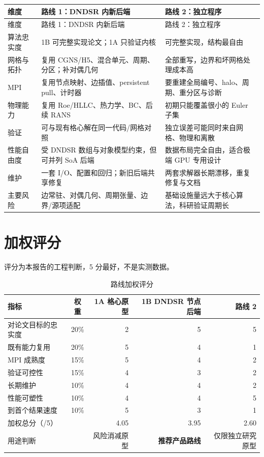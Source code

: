 \documentclass[UTF8,a4paper,11pt,openany]{ctexrep}
\numberwithin{equation}{chapter}
\begin{document}
\begin{longtable}{>{\raggedright\arraybackslash}p{}p{}p{}}
\toprule
维度 & 路线 1：DNDSR 内新后端 & 路线 2：独立程序\\
\midrule
\endfirsthead
\toprule
维度 & 路线 1：DNDSR 内新后端 & 路线 2：独立程序\\
\midrule
\endhead
算法忠实度 & 1B 可完整实现论文；1A 只验证内核 & 可完整实现，结构最自由\\
网格与拓扑 & 复用 CGNS/H5、混合单元、周期、分区；补对偶几何 & 全部重写，边界和坏网格处理成本高\\
MPI & 复用节点映射、边插值、persistent pull、计时器 & 要重建全局编号、halo、周期、重分区与诊断\\
物理能力 & 复用 Roe/HLLC、热力学、BC、后续 RANS & 初期只能覆盖很小的 Euler 子集\\
验证 & 可与现有格心解在同一代码/网格对照 & 独立误差可能同时来自网格、物理和离散\\
性能自由度 & 受 DNDSR 数组与对象模型约束，但可并列 SoA 后端 & 数据布局完全自由，适合极端 GPU 专用设计\\
维护 & 一套 I/O、配置和回归；新旧后端共享修复 & 两套求解器长期漂移，重复修复与文档\\
主要风险 & 边常驻、对偶几何、周期张量、边界/源项适配 & 基础设施量远大于核心算法，科研验证周期长\\
\bottomrule
\end{longtable}

\section{加权评分}

评分为本报告的工程判断，5 分最好，不是实测数据。

\begin{table}[htbp]
\centering
\caption{路线加权评分}
\begin{tabular}{lcrrr}
\toprule
指标 & 权重 & 1A 格心原型 & 1B DNDSR 节点后端 & 路线 2\\
\midrule
对论文目标的忠实度 & 20\% & 2 & 5 & 5\\
既有能力复用 & 20\% & 5 & 4 & 1\\
MPI 成熟度 & 15\% & 5 & 4 & 2\\
验证可控性 & 15\% & 4 & 3 & 2\\
长期维护 & 10\% & 4 & 4 & 2\\
性能可塑性 & 10\% & 4 & 4 & 5\\
到首个结果速度 & 10\% & 5 & 3 & 1\\
\midrule
加权总分（/5） & & 4.05 & 3.95 & 2.60\\
用途判断 & & 风险消减原型 & \textbf{推荐产品路线} & 仅限独立研究原型\\
\bottomrule
\end{tabular}
\end{table}
\end{document}
